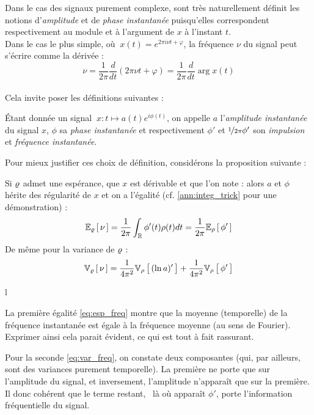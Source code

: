Dans le cas des signaux purement complexe, sont très naturellement définit les notions d'\emph{amplitude} et de \emph{phase instantanée} puisqu'elles correspondent respectivement au module et à l'argument de $x$ à l'instant $t$.
\\
Dans le cas le plus simple, où $\ x(t)=e^{2\pi i\nu t + \varphi}$, la fréquence $\nu$ du signal peut s'écrire comme la dérivée :
\[\nu = \frac{1}{2\pi} \frac{d}{dt} (2\pi \nu t + \varphi) = \frac{1}{2\pi} \frac{d}{dt} \arg x(t)\]
\\

Cela invite poser les définitions suivantes :
\begin{definition}
	\'Etant donnée un signal $\ x : t\longmapsto a(t)e^{i\phi(t)}$, on appelle $a$ l'\emph{amplitude instantanée} du signal $x$, $\phi$ sa \emph{phase instantanée} et respectivement $\phi'$ et $\nicefrac{1}{2\pi}\phi'$ son \emph{impulsion} et \emph{fréquence instantanée}.
\end{definition}
\skipl

Pour mieux justifier ces choix de définition, considérons la proposition suivante :

\begin{proposition}\label{prop:mom_freq}
	Si $\densis$ admet une espérance, que $x$ est dérivable et que l'on note :
	alors $a$ et $\phi$ hérite des régularité de $x$ et on a l'égalité (cf. \cref{ann:integ_trick} pour une démonstration) :
	\begin{equation}\label{eq:esp_freq}
		\esp[\densis]{\nu} = \frac{1}{2\pi}\int_\R \phi'(t)\densit(t)dt = \frac{1}{2\pi} \esp[\densit]{\phi'}
	\end{equation}
	De même pour la variance de $\densis$ :
	\begin{equation}\label{eq:var_freq}
		\var[\densis]{\nu} = \frac{1}{4\pi^2}\var[\densit]{(\ln a)'\big.} +\frac{1}{4\pi^2} \var[\densit]{\phi'\big.}
	\end{equation}
\end{proposition}
{\color{white}l} \\
\noindent 

La première égalité \eqref{eq:esp_freq} montre que la moyenne (temporelle) de la fréquence instantanée est égale à la fréquence moyenne (au sens de Fourier). Exprimer ainsi cela parait évident, ce qui est tout à fait rassurant.

Pour la seconde \eqref{eq:var_freq}, on constate deux composantes (qui, par ailleurs, sont des variances purement temporelle). La première ne porte que sur l'amplitude du signal, et inversement, l'amplitude n'apparaît que sur la première. Il donc cohérent que le terme restant, \ie~là où apparaît $\phi'$, porte l'information fréquentielle du signal.
\\



